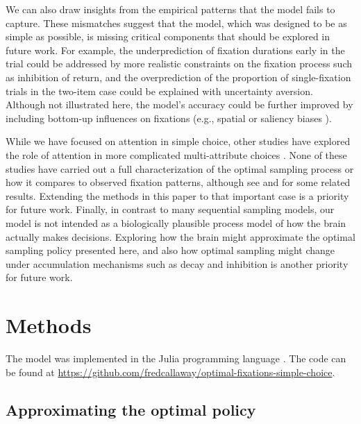We can also draw insights from the empirical patterns that the model fails to capture. These mismatches suggest that the model, which was designed to be as simple as possible, is missing critical components that should be explored in future work. For example, the underprediction of fixation durations early in the trial could be addressed by more realistic constraints on the fixation process such as inhibition of return, and the overprediction of the proportion of single-fixation trials in the two-item case could be explained with uncertainty aversion. Although not illustrated here, the model's accuracy could be further improved by including bottom-up influences on fixations (e.g., spatial or saliency biases \citealp{towal2013simultaneous,itti2000saliencybased}).

While we have focused on attention in simple choice, other studies have explored the role of attention in more complicated multi-attribute choices \citep{roe2001multialternative,noguchi2018multialternative,russo1983strategies,trueblood2014multiattribute,usher2004loss,berkowitsch2014rigorously,fisher2017attentional,krajbich2012attentional,westbrook2020dopamine,shi2013information,manohar2013attention}. None of these studies have carried out a full characterization of the optimal sampling process or how it compares to observed fixation patterns, although see \citet{gabaix2006costly} and \citet{yang2015bounded} for some related results. Extending the methods in this paper to that important case is a priority for future work. Finally, in contrast to many sequential sampling models, our model is not intended as a biologically plausible process model of how the brain actually makes decisions. Exploring how the brain might approximate the optimal sampling policy presented here, and also how optimal sampling might change under accumulation mechanisms such as decay and inhibition is another priority for future work.
 
\section{Methods}

The model was implemented in the Julia programming language \citep{bezanson2017julia}. The code can be found at \url{https://github.com/fredcallaway/optimal-fixations-simple-choice}.


\subsection{Approximating the optimal policy}\label{sec:attention-policy}

